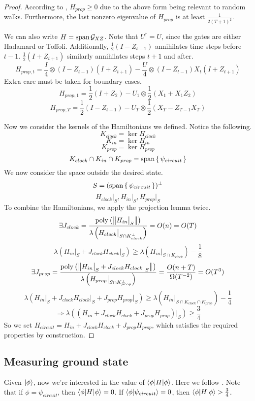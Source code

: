 \begin{proof}
According to \cite{2002quant.ph.10077A}, $H_{prop}\geq 0$ due to the above form being relevant to random walks. Furthermore, the last nonzero eigenvalue of $H_{prop}$ is at least $\frac{1}{2(T+1)^2}$.

We can also write $H=\operatorname*{\operatorname{span}}\mathcal{G}_{XZ}$. Note that $U^\dagger=U$, since the gates are either Hadamard or Toffoli. Additionally, $\frac{1}{2}(I-Z_{t-1})$ annihilates time steps before $t-1$. $\frac{1}{2}(I+Z_{t+1})$ similarly annihilates steps $t+1$ and after.
$$H_{prop,t}=\frac{I}{4}\otimes(I-Z_{t-1})(I+Z_{t+1})-\frac{U}{4}\otimes(I-Z_{t-1})X_t(I+Z_{t+1})$$
Extra care must be taken for boundary cases.
$$H_{prop,1}=\frac{1}{2}(I+Z_2)-U_1\otimes\frac{1}{2}(X_1+X_1Z_2)$$
$$H_{prop,T}=\frac{1}{2}(I-Z_{t-1})-U_T\otimes\frac{1}{2}(X_T-Z_{T-1}X_T)$$

Now we consider the kernels of the Hamiltonians we defined. Notice the following.
$$K_{clock}=\ker H_{clock}$$
$$K_{in}=\ker H_{in}$$
$$K_{prop}=\ker H_{prop}$$
$$K_{clock}\cap K_{in}\cap K_{prop}=\operatorname*{\operatorname{span}}\set{\psi_{circuit}}$$
We now consider the space outside the desired state.
$$S=(\operatorname*{\operatorname{span}}\set{\psi_{circuit}})^\bot$$
$$H_{clock}\big|_S,H_{in}\big|_S,H_{prop}\big|_S$$
To combine the Hamiltonians, we apply the projection lemma twice.
$$\exists J_{clock}
=\frac{\operatorname*{\operatorname{poly}}\left(\left\lVert H_{in}\big|_S\right\rVert\right)}{\lambda\left(H_{clock}\big|_{S\cap K^\bot_{clock}}\right)}
=O(n)=O(T)$$
$$\lambda(H_{in}\big|_S+J_{clock}H_{clock}\big|_S)\geq
\lambda(H_{in}\big|_{S\cap K_{clock}})-\frac{1}{8}$$
$$\exists J_{prop}=\frac{\operatorname*{\operatorname{poly}}\left(\left\lVert H_{in}\big|_S+J_{clock}H_{clock}\big|_S\right\rVert\right)}{\lambda\left(H_{prop}\big|_{S\cap K^\bot_{prop}}\right)}
=\frac{O(n+T)}{\Omega(T^{-2})}=O(T^3)$$
$$\lambda(H_{in}\big|_S+J_{clock}H_{clock}\big|_S+J_{prop}H_{prop}\big|_S)\geq
\lambda(H_{in}\big|_{S\cap K_{clock}\cap K_{prop}})-\frac{1}{4}$$
$$\Rightarrow\lambda((H_{in}+J_{clock}H_{clock}+J_{prop}H_{prop})\big|_S)\geq\frac{3}{4}$$
So we set $H_{circuit}=H_{in}+J_{clock}H_{clock}+J_{prop}H_{prop}$, which satisfies the required properties by construction.
\end{proof}

\subsection{Measuring ground state}

Given $\ket\phi$, now we're interested in the value of $\braket{\phi|H|\phi}$. Here we follow \cite{PhysRevA.93.022326}. Note that if $\phi=\psi_{circuit}$, then $\braket{\phi|H|\phi}=0$. If $\braket{\phi|\psi_{circuit}}=0$, then $\braket{\phi|H|\phi}>\frac{3}{4}$.

